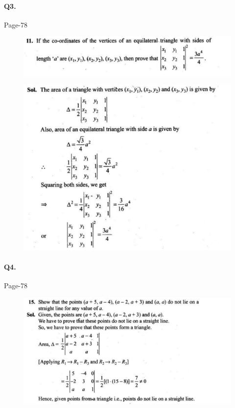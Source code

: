 \documentclass{article}
\begin{document}
\paragraph{Q3.}
\begin{flushright}
Page-78
\end{flushright}
\begin{figure}[H]
    \includegraphics[scale=0.5]{determinants_l1_ps_31.png}
\end{figure}
\begin{figure}[H]
    \includegraphics[scale=0.5]{determinants_l1_ps_32.png}
\end{figure}
\clearpage
\paragraph{Q4.}
\begin{flushright}
Page-78
\end{flushright}
\begin{figure}[H]
    \includegraphics[scale=0.5]{determinants_l1_ps_4.png}
\end{figure}
\clearpage
\end{document}
